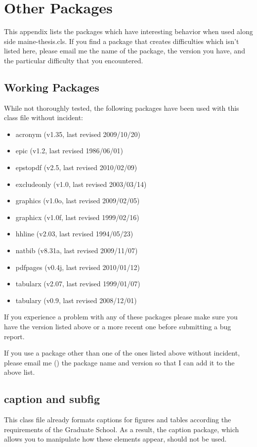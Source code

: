 \chapter{Other Packages}
\label{package}
This appendix lists the packages which have interesting behavior when used along side maine-thesis.cls.  If you find a package that creates difficulties which isn't listed here, please email me the name of the package, the version you have, and the particular difficulty that you encountered.

\section{Working Packages}
While not thoroughly tested, the following packages have been used with this class file without incident:
\begin{itemize}
\item{acronym (v1.35, last revised 2009/10/20)}
\item{epic (v1.2, last revised 1986/06/01)}
\item{epstopdf (v2.5, last revised 2010/02/09)}
\item{excludeonly (v1.0, last revised 2003/03/14)}
\item{graphics (v1.0o, last revised 2009/02/05)}
\item{graphicx (v1.0f, last revised 1999/02/16)}
\item{hhline (v2.03, last revised 1994/05/23)}
\item{natbib (v8.31a, last revised 2009/11/07)}
\item{pdfpages (v0.4j, last revised 2010/01/12)}
\item{tabularx (v2.07, last revised 1999/01/07)}
\item{tabulary (v0.9, last revised 2008/12/01)}
\end{itemize}
If you experience a problem with any of these packages please make sure you have the version listed above or a more recent one before submitting a bug report.

If you use a package other than one of the ones listed above without incident, please email me (\email) the package name and version so that I can add it to the above list.

\section{caption and subfig}
This class file already formats captions for figures and tables according the requirements of the Graduate School.  As a result, the caption package, which allows you to manipulate how these elements appear, should not be used.

